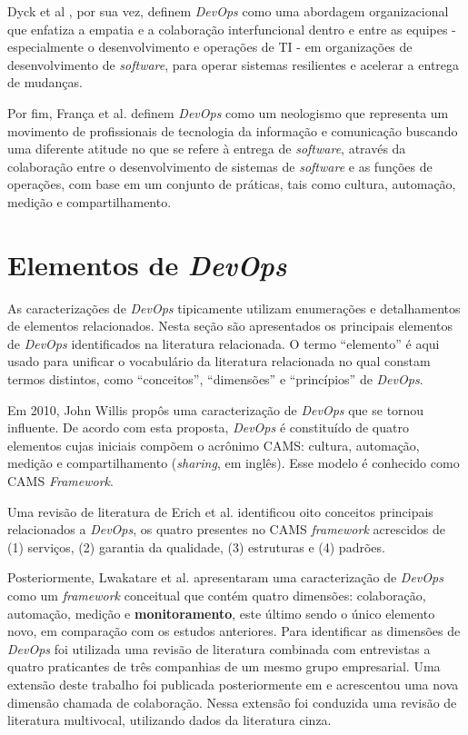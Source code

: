 Dyck et al \cite{towards_definitions}, por sua vez, definem \textit{DevOps}
como uma abordagem organizacional que enfatiza a empatia e a colaboração
interfuncional dentro e entre as equipes - especialmente o desenvolvimento e
operações de TI - em organizações de desenvolvimento de \textit{software}, para
operar sistemas resilientes e acelerar a entrega de mudanças.

Por fim, França et al. \cite{characterizing_devops} definem \textit{DevOps}
como um neologismo que representa um movimento de profissionais de tecnologia
da informação e comunicação buscando uma diferente atitude no que se refere à
entrega de \textit{software}, através da colaboração entre o desenvolvimento de
sistemas de \textit{software} e as funções de operações, com base em um conjunto
de práticas, tais como cultura, automação, medição e compartilhamento.

\section{Elementos de \textit{DevOps}}

As caracterizações de \textit{DevOps} tipicamente utilizam enumerações e
detalhamentos de elementos relacionados. Nesta seção são apresentados os
principais elementos de \textit{DevOps} identificados na literatura relacionada.
O termo ``elemento'' é aqui usado para unificar o vocabulário da literatura
relacionada no qual constam termos distintos, como ``conceitos'', ``dimensões''
e ``princípios'' de \textit{DevOps}.

Em 2010, John Willis propôs uma caracterização de \textit{DevOps}
\cite{what_devops_means_2010} que se tornou influente. De acordo com esta
proposta, \textit{DevOps} é constituído de quatro elementos cujas iniciais
compõem o acrônimo \acrshort{CAMS}: cultura, automação, medição e compartilhamento
(\textit{sharing}, em inglês). Esse modelo é conhecido como \acrshort{CAMS}
\textit{Framework}.

Uma revisão de literatura de Erich et al. \cite{cooperation_dev_ops_esem_2014}
identificou oito conceitos principais relacionados a \textit{DevOps}, os quatro
presentes no \acrshort{CAMS} \textit{framework} acrescidos de (1) serviços,
(2) garantia da qualidade, (3) estruturas e (4) padrões.

Posteriormente, Lwakatare et al. \cite{dimensions_of_devops} apresentaram uma
caracterização de \textit{DevOps} como um \textit{framework} conceitual que
contém quatro dimensões: colaboração, automação, medição e
\textbf{monitoramento}, este último sendo o único elemento novo, em comparação
com os estudos anteriores. Para identificar as dimensões de \textit{DevOps} foi
utilizada uma revisão de literatura combinada com entrevistas a quatro
praticantes de três companhias de um mesmo grupo empresarial. Uma extensão
deste trabalho foi publicada posteriormente em \cite{extending_dimensions} e
acrescentou uma nova dimensão chamada de colaboração. Nessa extensão foi
conduzida uma revisão de literatura multivocal, utilizando dados da literatura
cinza.

